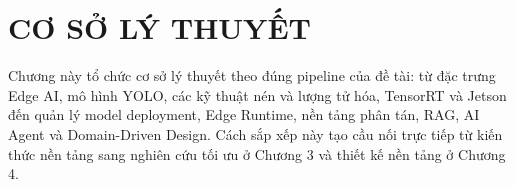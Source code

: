 \chapter{CƠ SỞ LÝ THUYẾT}

Chương này tổ chức cơ sở lý thuyết theo đúng pipeline của đề tài: từ đặc trưng
Edge AI, mô hình YOLO, các kỹ thuật nén và lượng tử hóa, TensorRT và Jetson đến
quản lý model deployment, Edge Runtime, nền tảng phân tán, RAG, AI Agent và
Domain-Driven Design. Cách sắp xếp này tạo cầu nối trực tiếp từ kiến thức nền
tảng sang nghiên cứu tối ưu ở Chương 3 và thiết kế nền tảng ở Chương 4.












